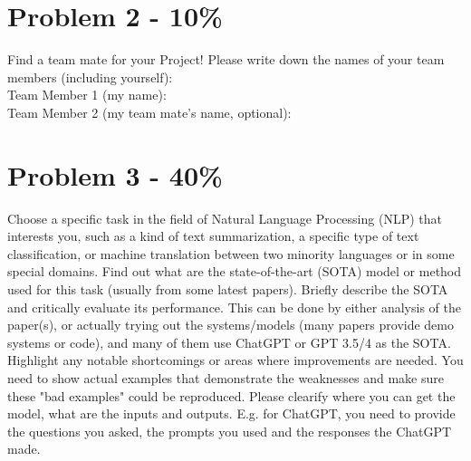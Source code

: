 \documentclass{article}
\begin{document}
\section*{Problem 2 - 10\%}
Find a team mate for your Project! 
Please write down the names of your team members (including yourself):\\
Team Member 1 (my name):\\
Team Member 2 (my team mate's name, optional):

\section*{Problem 3 - 40\%}
Choose a specific task in the field of Natural Language Processing (NLP) that 
interests you, such as a kind of text summarization, a specific type of
text classification, or machine translation between two minority languages or
in some special domains. 
Find out what are the state-of-the-art (SOTA) model or 
method used for this task (usually from some latest papers). 
Briefly describe the SOTA and critically evaluate its performance. 
This can be done by either analysis of the paper(s), or actually trying out 
the systems/models (many papers provide demo systems or code), and many of
them use ChatGPT or GPT 3.5/4 as the SOTA.
Highlight any notable shortcomings or areas where improvements are needed.
You need to show actual examples that demonstrate the weaknesses and make sure 
these "bad examples" could be reproduced. Please clearify where you can get the model,
what are the inputs and outputs. E.g. for ChatGPT, you need to provide the questions you asked,
the prompts you used and the responses the ChatGPT made.
\end{document}
